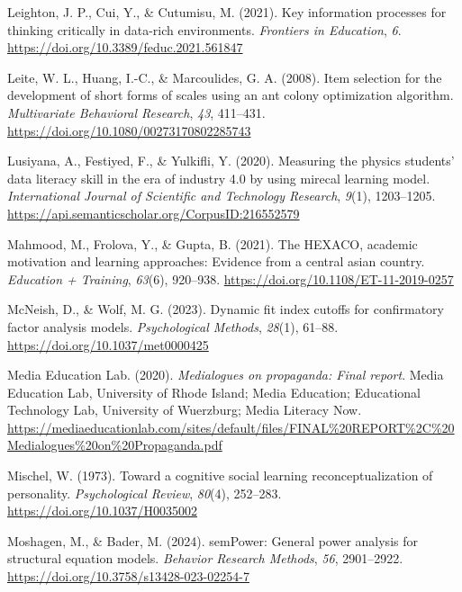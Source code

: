 \documentclass[
  12pt,
  a4paper,
  twoside]{article}
\newlength{\cslhangindent}
\newenvironment{CSLReferences}[2] %
 {\begin{list}{}{%
  \setlength{\itemindent}{0pt}
  \setlength{\leftmargin}{0pt}
  \setlength{\parsep}{0pt}
  \ifodd #1
   \setlength{\leftmargin}{\cslhangindent}
   \setlength{\itemindent}{-1\cslhangindent}
  \fi
  \setlength{\itemsep}{#2\baselineskip}}}
 {\end{list}}
\begin{document}
\begin{CSLReferences}{1}{0}
Leighton, J. P., Cui, Y., \& Cutumisu, M. (2021). Key information processes for thinking critically in data-rich environments. \emph{Frontiers in Education}, \emph{6}. \url{https://doi.org/10.3389/feduc.2021.561847}

Leite, W. L., Huang, I.-C., \& Marcoulides, G. A. (2008). Item selection for the development of short forms of scales using an ant colony optimization algorithm. \emph{Multivariate Behavioral Research}, \emph{43}, 411--431. \url{https://doi.org/10.1080/00273170802285743}

Lusiyana, A., Festiyed, F., \& Yulkifli, Y. (2020). Measuring the physics students' data literacy skill in the era of industry 4.0 by using mirecal learning model. \emph{International Journal of Scientific and Technology Research}, \emph{9}(1), 1203--1205. \url{https://api.semanticscholar.org/CorpusID:216552579}

Mahmood, M., Frolova, Y., \& Gupta, B. (2021). The HEXACO, academic motivation and learning approaches: Evidence from a central asian country. \emph{Education + Training}, \emph{63}(6), 920--938. \url{https://doi.org/10.1108/ET-11-2019-0257}

McNeish, D., \& Wolf, M. G. (2023). Dynamic fit index cutoffs for confirmatory factor analysis models. \emph{Psychological Methods}, \emph{28}(1), 61--88. \url{https://doi.org/10.1037/met0000425}

Media Education Lab. (2020). \emph{Medialogues on propaganda: Final report}. Media Education Lab, University of Rhode Island; Media Education; Educational Technology Lab, University of Wuerzburg; Media Literacy Now. \url{https://mediaeducationlab.com/sites/default/files/FINAL\%20REPORT\%2C\%20Medialogues\%20on\%20Propaganda.pdf}

Mischel, W. (1973). Toward a cognitive social learning reconceptualization of personality. \emph{Psychological Review}, \emph{80}(4), 252--283. \url{https://doi.org/10.1037/H0035002}

Moshagen, M., \& Bader, M. (2024). semPower: General power analysis for structural equation models. \emph{Behavior Research Methods}, \emph{56}, 2901--2922. \url{https://doi.org/10.3758/s13428-023-02254-7}


\end{CSLReferences}
\end{document}
